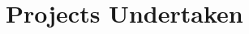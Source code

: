 \documentclass[]{friggeri-cv} %
\begin{document}












\section{Projects Undertaken}
\end{document}
